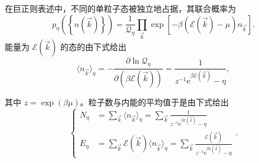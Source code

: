 在巨正则表述中，不同的单粒子态被独立地占据，其联合概率为
\begin{equation}\label{eq:7.28}
p_\eta\left(\left\{n(\vec k)\right\}\right)=\frac1{\mathcal Q_\eta}\prod_{\vec k}\exp\left[-\beta\left(\mathcal E(\vec k)-\mu\right)n_{\vec k}\right].
\end{equation}
能量为 $\mathcal E(\vec k)$ 的态的由下式给出
\begin{equation}\label{eq:7.29}
\langle n_{\vec k}\rangle_\eta=-\frac{\partial\ln\mathcal Q_\eta}{\partial\left(\beta\mathcal E(\vec k)\right)}=\frac1{z^{-1}\mathrm e^{\beta\mathcal E(\vec k)}-\eta},
\end{equation}


其中 $z=\exp(\beta\mu)$。粒子数与内能的平均值于是由下式给出
\begin{equation}\label{eq:7.30}
\left\{\begin{aligned}
N_\eta&=\sum_{\vec k}\langle n_{\vec k}\rangle_\eta=\sum_{\vec k}\frac1{z^{-1}\mathrm e^{\beta\mathcal E(\vec k)}-\eta}\\[1ex]
E_\eta&=\sum_{\vec k}\mathcal E(\vec k)\langle n_{\vec k}\rangle_\eta=\sum_{\vec k}\frac{\mathcal E(\vec k)}{z^{-1}\mathrm e^{\beta\mathcal E(\vec k)}-\eta}
\end{aligned}\right..
\end{equation}


